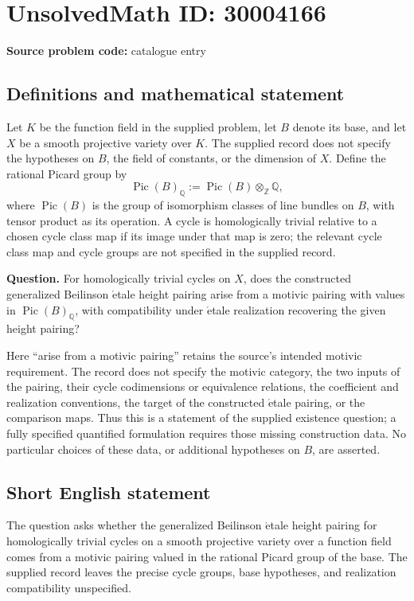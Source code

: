 \documentclass[11pt]{article}
\newcommand{\Z}{\mathbb{Z}}
\newcommand{\Q}{\mathbb{Q}}
\begin{document}
\section*{UnsolvedMath ID: 30004166}
\textbf{Source problem code:} catalogue entry
\subsection{Definitions and mathematical statement}
Let \(K\) be the function field in the supplied problem, let \(B\) denote its base, and let \(X\) be a smooth projective variety over \(K\). The supplied record does not specify the hypotheses on \(B\), the field of constants, or the dimension of \(X\). Define the rational Picard group by
\[
\operatorname{Pic}(B)_{\Q}:=\operatorname{Pic}(B)\otimes_{\Z}\Q,
\]
where \(\operatorname{Pic}(B)\) is the group of isomorphism classes of line bundles on \(B\), with tensor product as its operation. A cycle is homologically trivial relative to a chosen cycle class map if its image under that map is zero; the relevant cycle class map and cycle groups are not specified in the supplied record.

\textbf{Question.} For homologically trivial cycles on \(X\), does the constructed generalized Beilinson \(\acute{\mathrm{e}}\)tale height pairing arise from a motivic pairing with values in \(\operatorname{Pic}(B)_{\Q}\), with compatibility under \(\acute{\mathrm{e}}\)tale realization recovering the given height pairing?

Here ``arise from a motivic pairing'' retains the source's intended motivic requirement. The record does not specify the motivic category, the two inputs of the pairing, their cycle codimensions or equivalence relations, the coefficient and realization conventions, the target of the constructed \(\acute{\mathrm{e}}\)tale pairing, or the comparison maps. Thus this is a statement of the supplied existence question; a fully specified quantified formulation requires those missing construction data. No particular choices of these data, or additional hypotheses on \(B\), are asserted.
\subsection{Short English statement}
The question asks whether the generalized Beilinson \(\acute{\mathrm{e}}\)tale height pairing for homologically trivial cycles on a smooth projective variety over a function field comes from a motivic pairing valued in the rational Picard group of the base. The supplied record leaves the precise cycle groups, base hypotheses, and realization compatibility unspecified.
\end{document}
